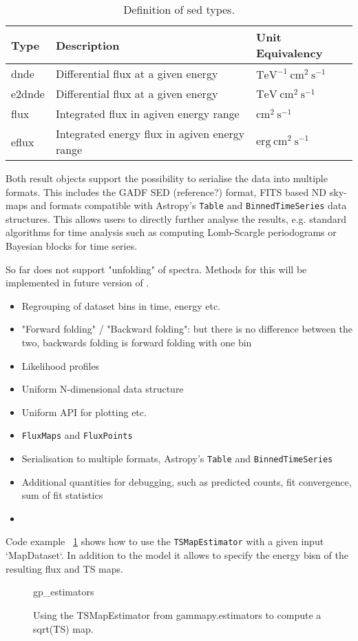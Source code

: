\begin{table*}
    \begin{center}
        \begin{tabular}{lll}
         \hline
         Type & Description & Unit Equivalency \\
         \hline
         dnde & Differential flux at a given energy & $\mathrm{TeV^{-1}~cm^{2}~s^{-1}}$ \\
         e2dnde & Differential flux at a given energy  & $\mathrm{TeV~cm^{2}~s^{-1}}$ \\
         flux & Integrated flux in agiven energy range & $\mathrm{cm^{2}~s^{-1}}$ \\
         eflux & Integrated energy flux in agiven energy range & $\mathrm{erg~cm^{2}~s^{-1}}$
        \end{tabular}
    \end{center}
    \label{tab:sed_types}
    \caption{Definition of sed types.}
\end{table*}


Both result objects support the possibility to serialise
the data into multiple formats. This includes the
GADF SED (reference?) format, FITS based ND sky-maps
and formats compatible with Astropy's \verb|Table| and
\verb|BinnedTimeSeries| data structures. This allows
users to directly further analyse the results, e.g.
standard algorithms for time analysis such as
computing Lomb-Scargle periodograms or Bayesian
blocks for time series.

So far \gammapy does not support "unfolding" of \gammaray spectra.
Methods for this will be implemented in future version of \gammapy.

\begin{itemize}
	\item Regrouping of dataset bins in time, energy etc.
	\item "Forward folding" / "Backward folding": but there is no
	      difference between the two, backwards folding is forward folding with one bin
	\item Likelihood profiles \item Uniform N-dimensional data structure \item
	      Uniform API for plotting etc. \item \verb|FluxMaps| and \verb|FluxPoints| \item
	      Serialisation to multiple formats, Astropy's \verb|Table| and
	      \verb|BinnedTimeSeries|
	\item Additional quantities for debugging, such as predicted counts, fit convergence,
	      sum of fit statistics \item \end{itemize}

Code example ~\ref{fig*:minted:gp_estimators} shows how to use
the \verb|TSMapEstimator| with a given input `MapDataset`.
In addition to the model it allows to specify the energy
bisn of the resulting flux and TS maps.

\begin{figure}
	{gp_estimators}
	\caption{Using the TSMapEstimator from gammapy.estimators to compute a
		sqrt(TS) map.} \label{fig*:minted:gp_estimators} \end{figure}
